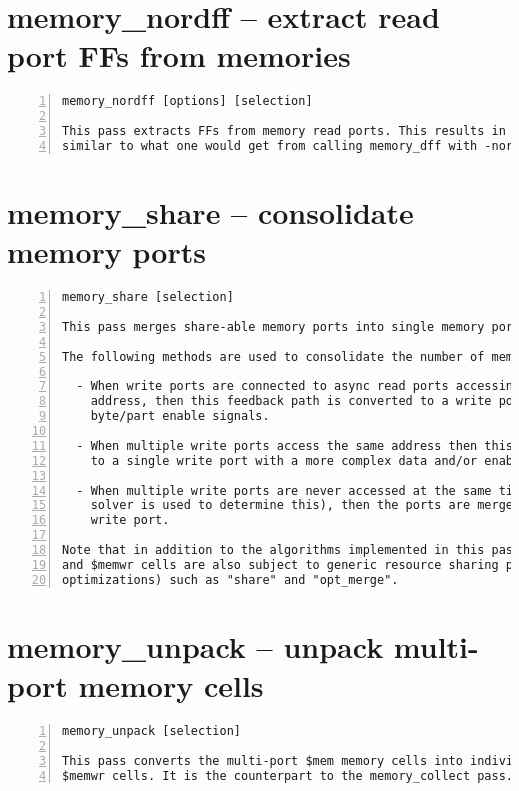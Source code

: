 \section{memory\_nordff -- extract read port FFs from memories}
\label{cmd:memory_nordff}
\begin{lstlisting}[numbers=left,frame=single]
    memory_nordff [options] [selection]

This pass extracts FFs from memory read ports. This results in a netlist
similar to what one would get from calling memory_dff with -nordff.
\end{lstlisting}

\section{memory\_share -- consolidate memory ports}
\label{cmd:memory_share}
\begin{lstlisting}[numbers=left,frame=single]
    memory_share [selection]

This pass merges share-able memory ports into single memory ports.

The following methods are used to consolidate the number of memory ports:

  - When write ports are connected to async read ports accessing the same
    address, then this feedback path is converted to a write port with
    byte/part enable signals.

  - When multiple write ports access the same address then this is converted
    to a single write port with a more complex data and/or enable logic path.

  - When multiple write ports are never accessed at the same time (a SAT
    solver is used to determine this), then the ports are merged into a single
    write port.

Note that in addition to the algorithms implemented in this pass, the $memrd
and $memwr cells are also subject to generic resource sharing passes (and other
optimizations) such as "share" and "opt_merge".
\end{lstlisting}

\section{memory\_unpack -- unpack multi-port memory cells}
\label{cmd:memory_unpack}
\begin{lstlisting}[numbers=left,frame=single]
    memory_unpack [selection]

This pass converts the multi-port $mem memory cells into individual $memrd and
$memwr cells. It is the counterpart to the memory_collect pass.
\end{lstlisting}

